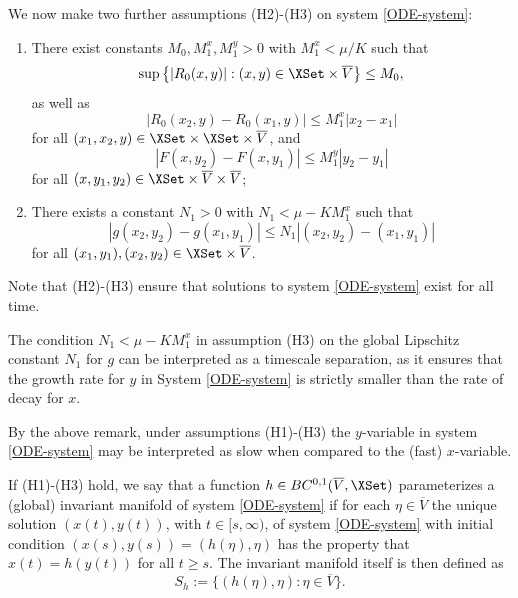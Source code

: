 \documentclass[a4paper]{siamart190516}
\begin{document}
 We now make two further assumptions (H2)-(H3) on system \cref{ODE-system}:
\vspace{0.2cm}
 \begin{enumerate}
 \item[$\mathrm{(H2)}$] There exist constants $M_0, M_1^x, M_1^y > 0$  with $M^x_1 < \mu / K$  such that
 \[ 
 \sup\left\{| R_0(x,y) | : (x,y) \in \XSet \times \overline{V} \right\} \leq M_0,
 \]
 as well as
  \[ 
| R_0(x_2,y) -  R_0(x_1,y) |  \leq M_1^x |x_2 - x_1|
 \]
 for all $(x_1,x_2,y) \in \XSet \times \XSet \times \overline{V}$, and
 \[
| F(x,y_2) -  F(x,y_1) | \leq M_1^y |y_2 - y_1|
 \]
 for all $(x,y_1,y_2) \in \XSet \times \overline{V} \times \overline{V}$;
 \item[$\mathrm{(H3)}$] There exists a constant $N_1 > 0$ with $N_1 < \mu - K M_1^x$ such that
 \[
 | g(x_2,y_2) - g(x_1,y_1) | \leq N_1 |(x_2,y_2) - (x_1,y_1)|
 \]
 for all $(x_1,y_1), (x_2,y_2) \in \XSet \times \overline{V}$.
 \end{enumerate}
 \vspace{0.25cm}
 Note that (H2)-(H3) ensure that solutions to system \cref{ODE-system} exist for all time.
 
 \begin{remark}
 The condition $N_1 < \mu-K M_1^x$ in assumption (H3) on the global Lipschitz constant $N_1$ for $g$ can be interpreted as a timescale separation, as it ensures that the growth rate for $y$ in System \cref{ODE-system} is strictly smaller than the rate of decay for $x$.
 \end{remark}
 
 By the above remark, under assumptions (H1)-(H3) the $y$-variable in system \cref{ODE-system} may be interpreted as slow when compared to the (fast) $x$-variable.
 
 \begin{definition}\label{def:slow-mfd}
If (H1)-(H3) hold, we say that a function $h \in BC^{0,1}(\overline{V},\XSet)$ parameterizes a (global) invariant manifold of system \cref{ODE-system} 
if for each $\eta \in \overline{V}$ the unique solution $(x(t), y(t))$, with $t \in [s,\infty)$, of system \cref{ODE-system} with initial condition $(x(s), y(s))=(h(\eta),\eta)$ 
has the property that $x(t)=h(y(t))$ for all $t \geq s$. The invariant manifold itself is then defined as
\[
S_h := \{ (h(\eta),\eta) : \eta \in \overline{V} \}.
\]
 \end{definition}
  
\end{document}
